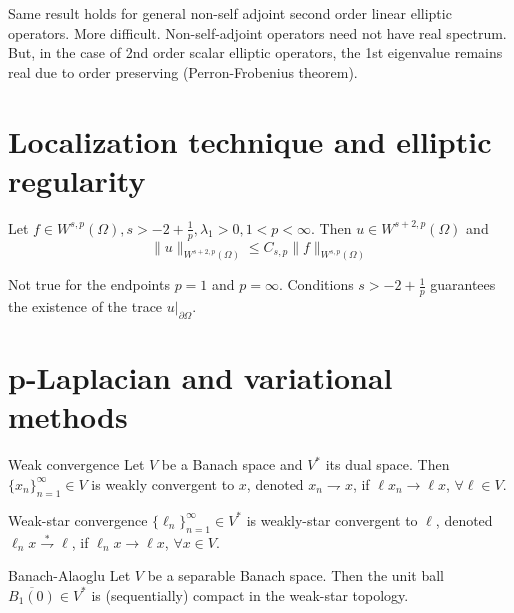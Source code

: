 \documentclass{report}
\begin{document}
\begin{note}
    Same result holds for general non-self adjoint second order linear elliptic operators. More difficult. Non-self-adjoint operators need not have real spectrum. But, in the case of 2nd order scalar elliptic operators, the 1st eigenvalue remains real due to order preserving (Perron-Frobenius theorem).
\end{note}

\section{Localization technique and elliptic regularity}
\begin{theorem}{}{}
    Let \(f \in W^{s, p}(\Omega), s > -2 + \frac{1}{p}, \lambda_{1} > 0, 1 < p < \infty\). Then \(u \in W^{s+2, p}(\Omega)\) and
    \begin{equation*}
        \|u\|_{W^{s+2, p}(\Omega)} \leq C_{s, p}\|f\|_{W^{s, p}(\Omega)}
    \end{equation*}
\end{theorem}

\begin{note}
    Not true for the endpoints \(p = 1\) and \(p = \infty\). Conditions \(s > -2 + \frac{1}{p}\) guarantees the existence of the trace \(\left. u \right|_{\partial \Omega}\).
\end{note}

\section{p-Laplacian and variational methods}

\begin{definition}{Weak convergence}{}
    Let \(V\) be a Banach space and \(V^{*}\) its dual space. Then \(\{x_{n}\}_{n=1}^{\infty} \in V\) is weakly convergent to \(x\), denoted \(x_{n} \rightharpoondown x\), if \(\ell x_{n} \to \ell x\), \(\forall \ell \in V\).
\end{definition}

\begin{definition}{Weak-star convergence}{}
    \(\{\ell_{n}\}_{n=1}^{\infty} \in V^{*}\) is weakly-star convergent to \(\ell\), denoted \(\ell_{n}x \overset{*}{\rightharpoondown} \ell\), if \(\ell_{n}x \to \ell x\), \(\forall x \in V\).
\end{definition}

\begin{theorem}{Banach-Alaoglu}{}
    Let \(V\) be a separable Banach space. Then the unit ball \(\overline{B_{1}(0)} \in V^{*}\) is (sequentially) compact in the weak-star topology.
\end{theorem}
\end{document}
